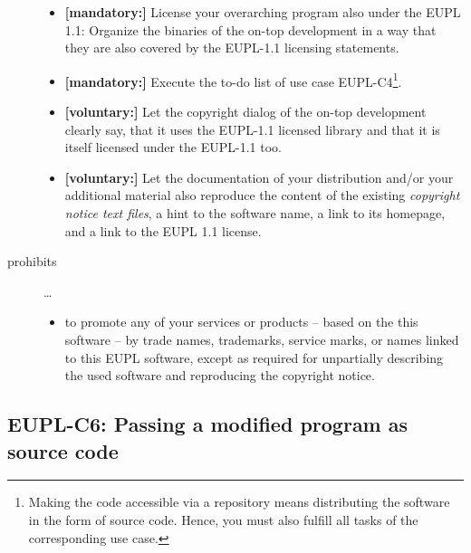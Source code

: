 \begin{description}
\begin{itemize}
  \item \textbf{[mandatory:]} License your overarching program also under the
  EUPL 1.1: Organize the binaries of the on-top development in a way that they
  are also covered by the EUPL-1.1 licensing statements.
  
  \item \textbf{[mandatory:]} Execute the to-do list of use case EUPL-C4\footnote{
  Making the code accessible via a repository means distributing the software in
  the form of source code. Hence, you must also fulfill all tasks of the
  corresponding use case.}.
  
 \item \textbf{[voluntary:]} Let the copyright dialog of the on-top development
  clearly say, that it uses the EUPL-1.1 licensed library and that it is itself
  licensed under the EUPL-1.1 too.
 
  \item \textbf{[voluntary:]} Let the documentation of your distribution and/or
  your additional material also reproduce the content of the existing
  \emph{copyright notice text files}, a hint to the software name, a link to its
  homepage, and a link to the EUPL 1.1 license.
\end{itemize}

\item[prohibits] \ldots
\begin{itemize}
  \item to promote any of your services or products -- based on the this software
  -- by trade names, trademarks, service marks, or names linked to this EUPL
  software, except as required for unpartially describing the used software and
  reproducing the copyright notice.
\end{itemize}

\end{description}

\subsection{EUPL-C6: Passing a modified program as source code}
\label{OSUC-04S-EUPL} 

